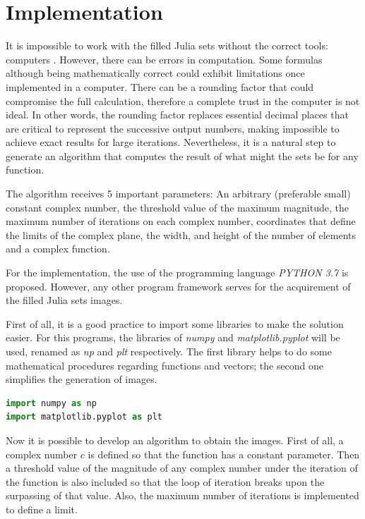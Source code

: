 \documentclass{article}
\begin{document}
\section{Implementation}

It is impossible to work with the filled Julia sets without the correct tools: computers \cite{Devaney}. However, there can be errors in computation. Some formulas although being mathematically correct could exhibit limitations once implemented in a computer. There can be a rounding factor that could compromise the full calculation, therefore a complete trust in the computer is not ideal. In other words, the rounding factor replaces essential decimal places that are critical to represent the successive output numbers, making impossible to achieve exact results for large iterations\cite{HHD}. Nevertheless, it is a natural step to generate an algorithm that computes the result of what might the sets be for any function.

The algorithm receives 5 important parameters:
An arbitrary (preferable small) constant complex number, the threshold value of the maximum magnitude, the maximum number of iterations on each complex number, coordinates that define the limits of the complex plane, the width, and height of the number of elements and a complex function.

For the implementation, the use of the programming language \textit{PYTHON 3.7} is proposed. However, any other program framework serves for the acquirement of the filled Julia sets images.

First of all, it is a good practice to import some libraries to make the solution easier. For this programs, the libraries of \textit{numpy} and \textit{matplotlib.pyplot} will be used, renamed as \textit{np} and \textit{plt} respectively. The first library helps to do some mathematical procedures regarding functions and vectors; the second one simplifies the generation of images. 

\begin{lstlisting}[language=Python, frame=single]
import numpy as np
import matplotlib.pyplot as plt
\end{lstlisting}

Now it is possible to develop an algorithm to obtain the images. First of all, a complex number $c$ is defined so that the function has a constant parameter. Then a threshold value of the magnitude of any complex number under the iteration of the function is also included so that the loop of iteration breaks upon the surpassing of that value. Also, the maximum number of iterations is implemented to define a limit.
\end{document}
